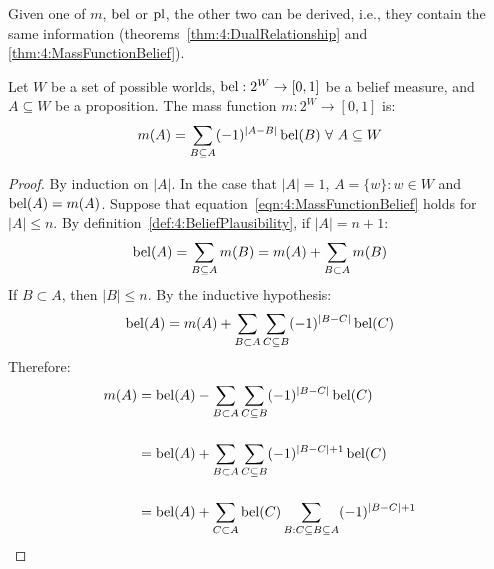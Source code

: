 Given one of $m$, $\operatorname*{bel}$ or $\operatorname*{pl}$, the other two can be derived, i.e., they
contain the same information (theorems~\ref{thm:4:DualRelationship} and
\ref{thm:4:MassFunctionBelief}).

\begin{thm}
  \label{thm:4:MassFunctionBelief}
  Let $W$ be a set of possible worlds, $\operatorname*{bel} : 2^W \to [0, 1]$ be a belief
  measure, and $A \subseteq W$ be a proposition.
  The mass function $m : 2^W \to [0, 1]$ is:
  \begin{equation}
    \label{eqn:4:MassFunctionBelief}
    m(A) = \sum_{B \subseteq A} (-1)^{|A - B|} \operatorname*{bel}(B)
    \ \forall\
    A \subseteq W
  \end{equation}

  \begin{proof}
    By induction on $|A|$.
    In the case that $|A| = 1$, $A = \{w\} : w \in W$ and $\operatorname*{bel}(A) = m(A)$.
    Suppose that equation~\ref{eqn:4:MassFunctionBelief} holds for $|A| \leq n$.
    By definition~\ref{def:4:BeliefPlausibility}, if $|A| = n + 1$:
    \begin{equation*}
      \operatorname*{bel}(A) = \sum_{B \subseteq A} m(B) = m(A) + \sum_{B \subset A} m(B)
    \end{equation*}
    If $B \subset A$, then $|B| \leq n$.
    By the inductive hypothesis:
    \begin{equation*}
      \operatorname*{bel}(A) = m(A) + \sum_{B \subset A} \sum_{C \subseteq B} (-1)^{|B - C|} \operatorname*{bel}(C)
    \end{equation*}
    Therefore:
    \begin{align}
      \label{eqn:4:MassFunctionBelief1}
      m(A)
       & =
      \operatorname*{bel}(A) -
      \sum_{B \subset A} \sum_{C \subseteq B} (-1)^{|B - C|} \operatorname*{bel}(C)
      \nonumber
      \\[3ex]
       & =
      \operatorname*{bel}(A) +
      \sum_{B \subset A} \sum_{C \subseteq B} (-1)^{|B - C| + 1} \operatorname*{bel}(C)
      \nonumber
      \\[3ex]
       & =
      \operatorname*{bel}(A) +
      \sum_{C \subset A} \operatorname*{bel}(C) \sum_{B : C \subseteq B \subseteq A} (-1)^{|B - C| + 1}
    \end{align}


\end{proof}
\end{thm}
